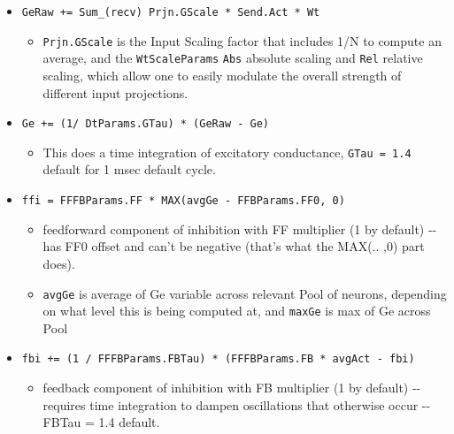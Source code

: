 \documentclass[10pt,letterpaper]{article}
\begin{document}
\begin{itemize}
  \item \texttt{GeRaw\ +=\ Sum\_(recv)\ Prjn.GScale\ *\ Send.Act\ *\ Wt}
    \begin{itemize}
	
    \item
      \texttt{Prjn.GScale} is the Input Scaling factor that
      includes 1/N to compute an average, and the \texttt{WtScaleParams}
      \texttt{Abs} absolute scaling and \texttt{Rel} relative scaling,
      which allow one to easily modulate the overall strength of
      different input projections.
    \end{itemize}
	
  \item \texttt{Ge\ +=\ (1/\ DtParams.GTau)\ *\ (GeRaw\ -\ Ge)}
    \begin{itemize}
	
    \item
      This does a time integration of excitatory conductance,
      \texttt{GTau\ =\ 1.4} default for 1 msec default cycle.
    \end{itemize}
	
  \item \texttt{ffi\ =\ FFFBParams.FF\ *\ MAX(avgGe\ -\ FFBParams.FF0,\ 0)}

    \begin{itemize}
	
    \item
      feedforward component of inhibition with FF multiplier (1 by
      default) -\/- has FF0 offset and can't be negative (that's what
      the MAX(.. ,0) part does).
    \item
      \texttt{avgGe} is average of Ge variable across relevant Pool of
      neurons, depending on what level this is being computed at, and
      \texttt{maxGe} is max of Ge across Pool
    \end{itemize}

  \item \texttt{fbi\ +=\ (1\ /\ FFFBParams.FBTau)\ *\ (FFFBParams.FB\ *\ avgAct\ -\ fbi)}

    \begin{itemize}
	
    \item
      feedback component of inhibition with FB multiplier (1 by default)
      -\/- requires time integration to dampen oscillations that
      otherwise occur -\/- FBTau = 1.4 default.
    \end{itemize}
	

\end{itemize}
\end{document}
